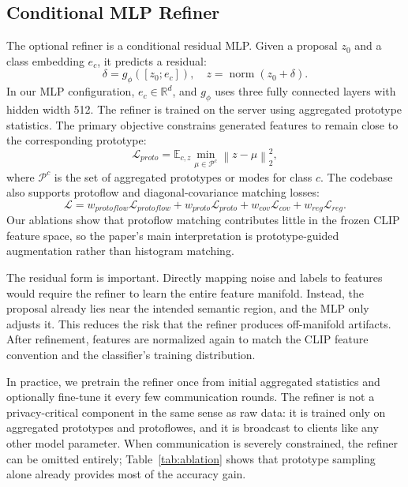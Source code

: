 ﻿\documentclass[conference]{IEEEtran}
\newcommand{\clip}{CLIP}
\newcommand{\R}{\mathbb{R}}
\newcommand{\norm}[1]{\left\lVert #1 \right\rVert}
\begin{document}
\subsection{Conditional MLP Refiner}
The optional refiner is a conditional residual MLP. Given a proposal $z_0$ and a class embedding $e_c$, it predicts a residual:
\begin{equation}
\delta = g_\phi([z_0; e_c]), \quad z = \operatorname{norm}(z_0+\delta).
\end{equation}
In our MLP configuration, $e_c\in\R^d$, and $g_\phi$ uses three fully connected layers with hidden width 512. The refiner is trained on the server using aggregated prototype statistics. The primary objective constrains generated features to remain close to the corresponding prototype:
\begin{equation}
\mathcal{L}_{proto} = \mathbb{E}_{c,z}\min_{\mu\in\mathcal{P}^c}\norm{z-\mu}_2^2,
\end{equation}
where $\mathcal{P}^c$ is the set of aggregated prototypes or modes for class $c$. The codebase also supports protoflow and diagonal-covariance matching losses:
\begin{equation}
\mathcal{L} = w_{protoflow}\mathcal{L}_{protoflow}+w_{proto}\mathcal{L}_{proto}+w_{cov}\mathcal{L}_{cov}+w_{reg}\mathcal{L}_{reg}.
\end{equation}
Our ablations show that protoflow matching contributes little in the frozen \clip{} feature space, so the paper's main interpretation is prototype-guided augmentation rather than histogram matching.

The residual form is important. Directly mapping noise and labels to features would require the refiner to learn the entire feature manifold. Instead, the proposal already lies near the intended semantic region, and the MLP only adjusts it. This reduces the risk that the refiner produces off-manifold artifacts. After refinement, features are normalized again to match the \clip{} feature convention and the classifier's training distribution.

In practice, we pretrain the refiner once from initial aggregated statistics and optionally fine-tune it every few communication rounds. The refiner is not a privacy-critical component in the same sense as raw data: it is trained only on aggregated prototypes and protoflowes, and it is broadcast to clients like any other model parameter. When communication is severely constrained, the refiner can be omitted entirely; Table~\ref{tab:ablation} shows that prototype sampling alone already provides most of the accuracy gain.
\end{document}
